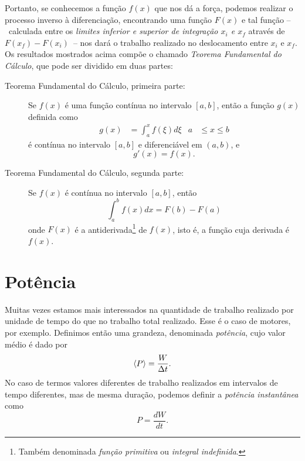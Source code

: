 Portanto, se conhecemos a função $f(x)$ que nos dá a força, podemos realizar o processo inverso à diferenciação, encontrando uma função $F(x)$ e tal função --~calculada entre os \emph{limites inferior e superior de integração $x_i$ e $x_f$} através de $F(x_f) - F(x_i)$~-- nos dará o trabalho realizado no deslocamento entre $x_i$ e $x_f$. Os resultados mostrados acima compõe o chamado \emph{Teorema Fundamental do Cálculo}, que pode ser dividido em duas partes:
\begin{description}
  \item[Teorema Fundamental do Cálculo, primeira parte:] Se $f(x)$ é uma função contínua no intervalo $[a,b]$, então a função $g(x)$ definida como
  \begin{align}
    g(x) &= \int_a^x f(\xi) d\xi & a&\leq x \leq b
  \end{align}
  é contínua no intervalo $[a,b]$ e diferenciável em $(a,b)$, e
  \begin{equation}
    g'(x) = f(x).
  \end{equation}
  \item[Teorema Fundamental do Cálculo, segunda parte:] Se $f(x)$ é contínua no intervalo $[a,b]$, então
  \begin{equation}
    \int_a^b f(x) dx = F(b) - F(a)
  \end{equation}
  onde $F(x)$ é a antiderivada\footnote{Também denominada \emph{função primitiva} ou \emph{integral indefinida}.} de $f(x)$, isto é, a função cuja derivada é $f(x)$.
\end{description}

\section{Potência}

Muitas vezes estamos mais interessados na quantidade de trabalho realizado por unidade de tempo do que no trabalho total realizado. Esse é o caso de motores, por exemplo. Definimos então uma grandeza, denominada \emph{potência}, cujo valor médio é dado por
\begin{equation}
  \left\langle{P}\right\rangle = \frac{W}{\Delta t}.
\end{equation}
%
No caso de termos valores diferentes de trabalho realizados em intervalos de tempo diferentes, mas de mesma duração, podemos definir a \emph{potência instantânea} como
\begin{equation}\label{Eq:DefPotenciaInstantanea}
  P = \frac{dW}{dt}.
\end{equation}

